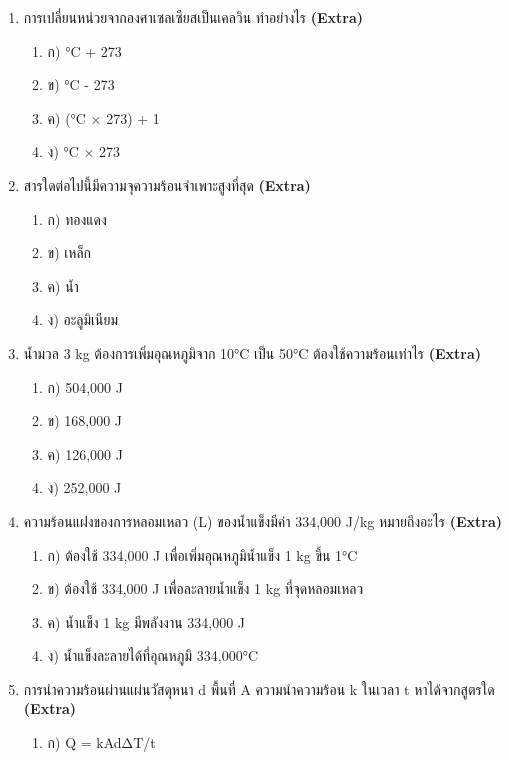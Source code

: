 \documentclass[12pt]{article}
\begin{document}
\begin{enumerate}[label=\arabic*.]
\begin{enumerate}[label=)]
\item ข) 4/3 เท่า
\item ค) 1.33 เท่า
\item ง) 127/27 เท่า
\end{enumerate}
\item การเปลี่ยนหน่วยจากองศาเซลเซียสเป็นเคลวิน ทำอย่างไร \hfill \textbf{\small (Extra)}
\begin{enumerate}[label=)]
\item ก) °C + 273
\item ข) °C - 273
\item ค) (°C × 273) + 1
\item ง) °C × 273
\end{enumerate}
\item สารใดต่อไปนี้มีความจุความร้อนจำเพาะสูงที่สุด \hfill \textbf{\small (Extra)}
\begin{enumerate}[label=)]
\item ก) ทองแดง
\item ข) เหล็ก
\item ค) น้ำ
\item ง) อะลูมิเนียม
\end{enumerate}
\item น้ำมวล 3 kg ต้องการเพิ่มอุณหภูมิจาก 10°C เป็น 50°C ต้องใช้ความร้อนเท่าไร \hfill \textbf{\small (Extra)}
\begin{enumerate}[label=)]
\item ก) 504,000 J
\item ข) 168,000 J
\item ค) 126,000 J
\item ง) 252,000 J
\end{enumerate}
\item ความร้อนแฝงของการหลอมเหลว (L) ของน้ำแข็งมีค่า 334,000 J/kg หมายถึงอะไร \hfill \textbf{\small (Extra)}
\begin{enumerate}[label=)]
\item ก) ต้องใช้ 334,000 J เพื่อเพิ่มอุณหภูมิน้ำแข็ง 1 kg ขึ้น 1°C
\item ข) ต้องใช้ 334,000 J เพื่อละลายน้ำแข็ง 1 kg ที่จุดหลอมเหลว
\item ค) น้ำแข็ง 1 kg มีพลังงาน 334,000 J
\item ง) น้ำแข็งละลายได้ที่อุณหภูมิ 334,000°C
\end{enumerate}
\item การนำความร้อนผ่านแผ่นวัสดุหนา d พื้นที่ A ความนำความร้อน k ในเวลา t หาได้จากสูตรใด \hfill \textbf{\small (Extra)}
\begin{enumerate}[label=)]
\item ก) Q = kAdΔT/t

\end{enumerate}
\end{enumerate}
\end{document}
